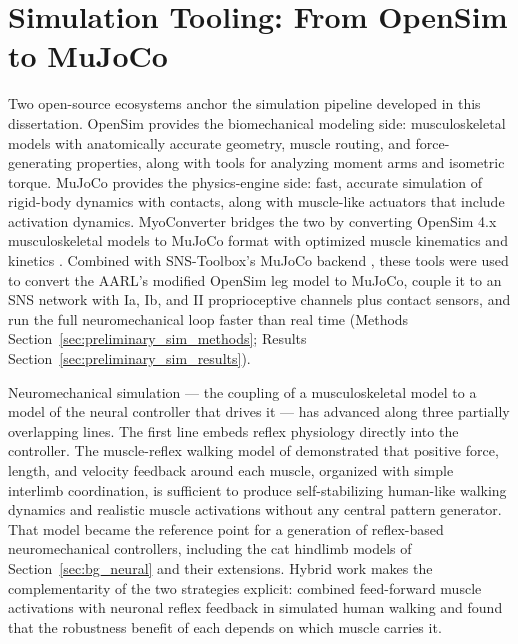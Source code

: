 \section{Simulation Tooling: From OpenSim to MuJoCo}\label{sec:bg_tools}Two open-source ecosystems anchor the simulation pipeline developed in this dissertation. OpenSim \citep{delp_opensim_2007, seth_opensim_2018} provides the biomechanical modeling side: musculoskeletal models with anatomically accurate geometry, muscle routing, and force-generating properties, along with tools for analyzing moment arms and isometric torque. MuJoCo \citep{todorov_mujoco_2012} provides the physics-engine side: fast, accurate simulation of rigid-body dynamics with contacts, along with muscle-like actuators that include activation dynamics. MyoConverter bridges the two by converting OpenSim 4.x musculoskeletal models to MuJoCo format with optimized muscle kinematics and kinetics \citep{caggiano_myosuite_2022, wang_myosim_2022}. Combined with SNS-Toolbox's MuJoCo backend \citep{nourse_sns_2023}, these tools were used to convert the AARL's modified OpenSim leg model to MuJoCo, couple it to an SNS network with Ia, Ib, and II proprioceptive channels plus contact sensors, and run the full neuromechanical loop faster than real time (Methods Section~\ref{sec:preliminary_sim_methods}; Results Section~\ref{sec:preliminary_sim_results}).


Neuromechanical simulation --- the coupling of a musculoskeletal model to a model of the neural controller that drives it --- has advanced along three partially overlapping lines. The first line embeds reflex physiology directly into the controller. The muscle-reflex walking model of \citet{geyer_musclereflex_2010} demonstrated that positive force, length, and velocity feedback around each muscle, organized with simple interlimb coordination, is sufficient to produce self-stabilizing human-like walking dynamics and realistic muscle activations without any central pattern generator. That model became the reference point for a generation of reflex-based neuromechanical controllers, including the cat hindlimb models of Section~\ref{sec:bg_neural} \citep{markin_afferent_2010, shevtsova_modeling_2016} and their extensions. Hybrid work makes the complementarity of the two strategies explicit: \citet{haeufle_benefit_2018} combined feed-forward muscle activations with neuronal reflex feedback in simulated human walking and found that the robustness benefit of each depends on which muscle carries it.

